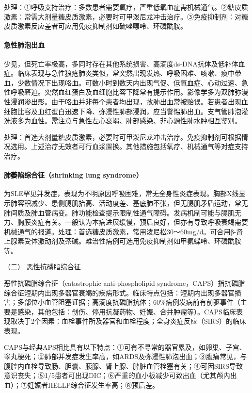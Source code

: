 处理：①呼吸支持治疗：多数患者需要氧疗，严重低氧血症需机械通气。②糖皮质激素：常需大剂量糖皮质激素，必要时可甲泼尼龙冲击治疗。③免疫抑制剂：对糖皮质激素反应差者可应用免疫抑制剂如硫唑嘌呤、环磷酰胺。

\paragraph{急性肺泡出血}

少见，但死亡率极高，多同时存在其他系统损害、高滴度ds-DNA抗体及低补体血症。临床表现与急性狼疮肺炎类似，常突然出现发热、呼吸困难、咳嗽、痰中带血，少数情况下出现咯血。可数小时到数天内出现气促、低氧血症、心动过速、急性呼吸窘迫。突然血红蛋白及血细胞比容下降常有提示作用。影像学多为双肺弥漫性浸润渗出影。由于咯血并非每个患者均出现，故肺出血常被贻误。若患者出现血细胞比容及血红蛋白迅速下降、弥漫性肺部浸润，应当警惕肺出血。支气管肺泡灌洗液多为血性。需注意与急性左心衰竭、肺部感染、非心源性肺水肿相互鉴别。

处理：首选大剂量糖皮质激素，必要时可甲泼尼龙冲击治疗。免疫抑制剂可根据情况选用。上述治疗无效者可行血浆置换。其他措施包括氧疗、机械通气等对症支持治疗。

\paragraph{肺萎陷综合征（shrinking lung syndrome）}

为SLE罕见并发症，表现为不明原因呼吸困难，常无全身性炎症表现。胸部X线显示肺容积减少、患侧膈肌抬高、活动度差、基底肺不张，但无膈肌矛盾运动，常无肺间质及肺血管病变。肺功能检查提示限制性通气障碍。发病机制可能与膈肌无力、胸膜炎症有关。一般认为本病进展缓慢，预后良好，但亦有导致呼吸衰竭需要机械通气的报道。处理：首选糖皮质激素，常用泼尼松30～60mg/d。可合用β-肾上腺素受体激动剂及茶碱。难治性病例可选用免疫抑制剂如甲氨蝶呤、环磷酰胺等。

\hypertarget{text00347.htmlux5cux23CHP14-1-3-9-2}{}
（二） 恶性抗磷脂综合征

恶性抗磷脂综合征（catastrophic anti-phospholipid
syndrome，CAPS）指抗磷脂综合征短期内出现多器官衰竭的疾病形式。临床特点包括：短期内出现多器官损害；多部位小血管阻塞证据；高滴度抗磷脂抗体；60\%病例发病前有前驱事件（主要是感染，其他包括：创伤、停用抗凝药物、妊娠、合并肿瘤等）。CAPS临床表现取决于2个因素：血栓事件所及器官和血栓程度；全身炎症反应（SIRS）的临床表现。

CAPS与经典APS相比具有以下特点：①可有不寻常的器官累及，如卵巢、子宫、睾丸梗死；②肺部并发症发生率高，如ARDS及弥漫性肺泡出血；③腹痛常见，与腹腔内血栓导致肠、胆囊、胰腺、肾上腺、脾脏血管栓塞有关；④可因SIRS导致意识丧失；⑤1/5患者可出现DIC；⑥严重的血小板减少可致出血（尤其颅内出血）；⑦妊娠者HELLP综合征发生率高；⑧预后差。


